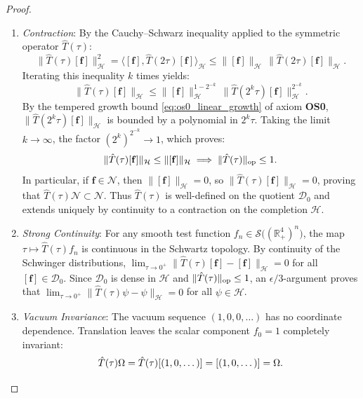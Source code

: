 \begin{proof}
\begin{enumerate}
    \item \emph{Contraction}: By the Cauchy--Schwarz inequality applied to the symmetric operator $\hat{T}(\tau)$:
    \begin{equation}
    \|\hat{T}(\tau) [\mathbf{f}]\|_{\mathcal{H}}^2 = \langle [\mathbf{f}], \hat{T}(2\tau) [\mathbf{f}] \rangle_{\mathcal{H}} \le \|[\mathbf{f}]\|_{\mathcal{H}} \, \|\hat{T}(2\tau) [\mathbf{f}]\|_{\mathcal{H}}.
    \end{equation}
    Iterating this inequality $k$ times yields:
    \begin{equation}
    \|\hat{T}(\tau) [\mathbf{f}]\|_{\mathcal{H}} \le \|[\mathbf{f}]\|_{\mathcal{H}}^{1 - 2^{-k}} \, \|\hat{T}(2^k \tau) [\mathbf{f}]\|_{\mathcal{H}}^{2^{-k}}.
    \end{equation}
    By the tempered growth bound \eqref{eq:os0_linear_growth} of axiom \textbf{OS0}, $\|\hat{T}(2^k \tau) [\mathbf{f}]\|_{\mathcal{H}}$ is bounded by a polynomial in $2^k \tau$. Taking the limit $k \to \infty$, the factor $(2^k)^{2^{-k}} \to 1$, which proves:
    \begin{equation}
    \|\hat{T}(\tau) [\mathbf{f}]\|_{\mathcal{H}} \le \|[\mathbf{f}]\|_{\mathcal{H}} \implies \|\hat{T}(\tau)\|_{\mathrm{op}} \le 1.
    \end{equation}
    In particular, if $\mathbf{f} \in \mathcal{N}$, then $\|[\mathbf{f}]\|_{\mathcal{H}} = 0$, so $\|\hat{T}(\tau) [\mathbf{f}]\|_{\mathcal{H}} = 0$, proving that $\hat{T}(\tau) \mathcal{N} \subset \mathcal{N}$. Thus $\hat{T}(\tau)$ is well-defined on the quotient $\mathcal{D}_0$ and extends uniquely by continuity to a contraction on the completion $\mathcal{H}$.

    \item \emph{Strong Continuity}: For any smooth test function $f_n \in \mathcal{S}\bigl( (\mathbb{R}_+^4)^n \bigr)$, the map $\tau \mapsto \hat{T}(\tau) f_n$ is continuous in the Schwartz topology. By continuity of the Schwinger distributions, $\lim_{\tau \to 0^+} \|\hat{T}(\tau) [\mathbf{f}] - [\mathbf{f}]\|_{\mathcal{H}} = 0$ for all $[\mathbf{f}] \in \mathcal{D}_0$. Since $\mathcal{D}_0$ is dense in $\mathcal{H}$ and $\|\hat{T}(\tau)\|_{\mathrm{op}} \le 1$, an $\epsilon/3$-argument proves that $\lim_{\tau \to 0^+} \|\hat{T}(\tau) \psi - \psi\|_{\mathcal{H}} = 0$ for all $\psi \in \mathcal{H}$.

    \item \emph{Vacuum Invariance}: The vacuum sequence $(1, 0, 0, \dots)$ has no coordinate dependence. Translation leaves the scalar component $f_0 = 1$ completely invariant:
    \begin{equation}
    \hat{T}(\tau) \Omega = \hat{T}(\tau) [(1, 0, \dots)] = [(1, 0, \dots)] = \Omega. \qedhere
    \end{equation}
\end{enumerate}
\end{proof}

